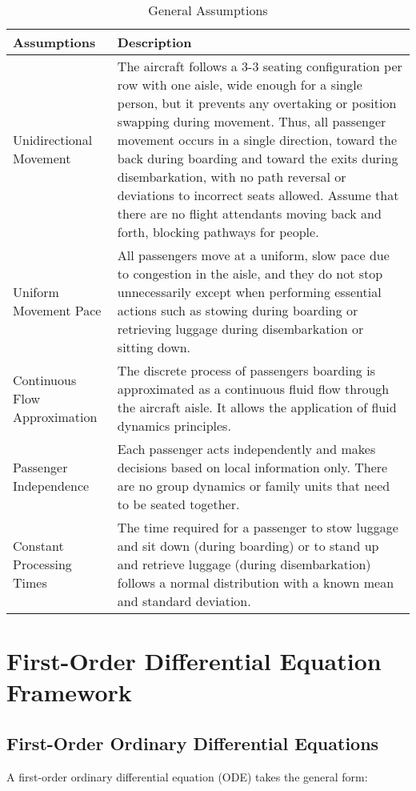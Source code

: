 \documentclass[12pt,a4paper]{article}
\begin{document}
\begin{table}[H]
\centering
\begin{tabular}{|p{3cm}|p{11cm}|}
\hline
\textbf{Assumptions} & \textbf{Description} \\
\hline
Unidirectional Movement & The aircraft follows a 3-3 seating configuration per row with one aisle, wide enough for a single person, but it prevents any overtaking or position swapping during movement. Thus, all passenger movement occurs in a single direction, toward the back during boarding and toward the exits during disembarkation, with no path reversal or deviations to incorrect seats allowed. Assume that there are no flight attendants moving back and forth, blocking pathways for people. \\
\hline
Uniform Movement Pace & All passengers move at a uniform, slow pace due to congestion in the aisle, and they do not stop unnecessarily except when performing essential actions such as stowing during boarding or retrieving luggage during disembarkation or sitting down. \\
\hline
Continuous Flow Approximation & The discrete process of passengers boarding is approximated as a continuous fluid flow through the aircraft aisle. It allows the application of fluid dynamics principles. \\
\hline
Passenger Independence & Each passenger acts independently and makes decisions based on local information only. There are no group dynamics or family units that need to be seated together. \\
\hline
Constant Processing Times & The time required for a passenger to stow luggage and sit down (during boarding) or to stand up and retrieve luggage (during disembarkation) follows a normal distribution with a known mean and standard deviation. \\
\hline
\end{tabular}
\caption{General Assumptions}
\label{tab:assumptions}
\end{table}

\section{First-Order Differential Equation Framework}
\subsection{First-Order Ordinary Differential Equations}

A first-order ordinary differential equation (ODE) takes the general form:
\end{document}
